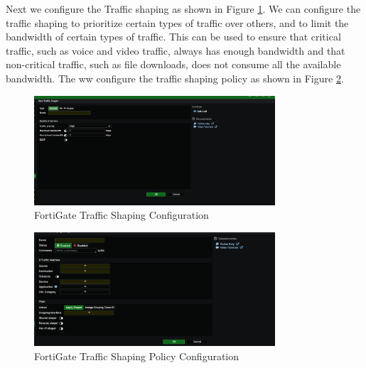 \documentclass[12pt]{report}
\begin{document}
Next we configure the Traffic shaping as shown in Figure \ref{fig:ts}. We can configure the traffic shaping to prioritize certain types of traffic over others, and to limit the bandwidth of certain types of traffic. This can be used to ensure that critical traffic, such as voice and video traffic, always has enough bandwidth and that non-critical traffic, such as file downloads, does not consume all the available bandwidth. The ww configure the traffic shaping policy as shown in Figure \ref{fig:tspolicy}.
\begin{figure}
    \centering
    \includegraphics[width=0.8\textwidth]{images/Implementation/ts.png}
    \caption{FortiGate Traffic Shaping Configuration}
    \label{fig:ts}
\end{figure}
\begin{figure}
    \centering
    \includegraphics[width=0.8\textwidth]{images/Implementation/tspolicy.png}
    \caption{FortiGate Traffic Shaping Policy Configuration}
    \label{fig:tspolicy}
\end{figure}
\end{document}
